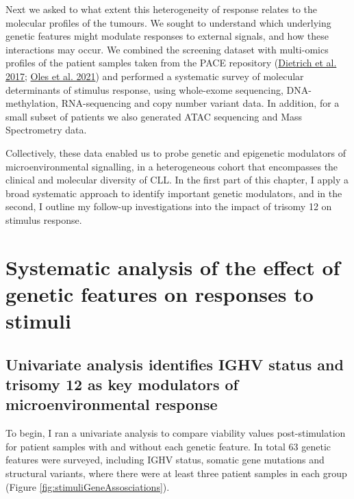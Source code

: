 \documentclass[11pt, a4paper, twosided]{book}
\begin{document}
Next we asked to what extent this heterogeneity of response relates to the molecular profiles of the tumours. We sought to understand which underlying genetic features might modulate responses to external signals, and how these interactions may occur. We combined the screening dataset with multi-omics profiles of the patient samples taken from the PACE repository (\protect\hyperlink{ref-JCIpaper}{Dietrich et al. 2017}; \protect\hyperlink{ref-R-BloodCancerMultiOmics2017}{Oles et al. 2021}) and performed a systematic survey of molecular determinants of stimulus response, using whole-exome sequencing, DNA-methylation, RNA-sequencing and copy number variant data. In addition, for a small subset of patients we also generated ATAC sequencing and Mass Spectrometry data.

Collectively, these data enabled us to probe genetic and epigenetic modulators of microenvironmental signalling, in a heterogeneous cohort that encompasses the clinical and molecular diversity of CLL. In the first part of this chapter, I apply a broad systematic approach to identify important genetic modulators, and in the second, I outline my follow-up investigations into the impact of trisomy 12 on stimulus response.

\hypertarget{systematic-analysis-of-the-effect-of-genetic-features-on-responses-to-stimuli}{%
\section{Systematic analysis of the effect of genetic features on responses to stimuli}\label{systematic-analysis-of-the-effect-of-genetic-features-on-responses-to-stimuli}}

\hypertarget{univariate-gene-stimulus-assosciations}{%
\subsection{Univariate analysis identifies IGHV status and trisomy 12 as key modulators of microenvironmental response}\label{univariate-gene-stimulus-assosciations}}

To begin, I ran a univariate analysis to compare viability values post-stimulation for patient samples with and without each genetic feature. In total 63 genetic features were surveyed, including IGHV status, somatic gene mutations and structural variants, where there were at least three patient samples in each group (Figure \ref{fig:stimuliGeneAssosciations}).
\end{document}
